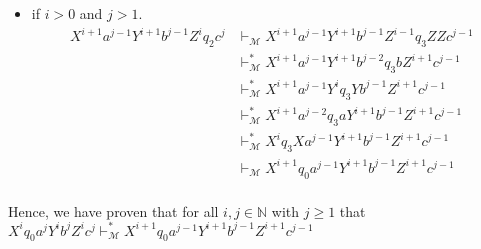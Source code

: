 \documentclass[12pt]{article}
\begin{document}
\begin{itemize}
  \item if \(i > 0\) and \(j > 1\).
  \begin{align*}
    X^{i+1}a^{j-1}Y^{i+1}b^{j-1}Z^iq_2c^j & \vdash_\mathcal{M} X^{i+1}a^{j-1}Y^{i+1}b^{j-1}Z^{i-1}q_3ZZc^{j-1} \tag*{(transition from \(q_2\) to \(q_3\))}\\
    & \vdash^{*}_\mathcal{M} X^{i+1}a^{j-1}Y^{i+1}b^{j-2}q_3bZ^{i+1}c^{j-1} \tag*{(L3 by taking x = Z)}\\
    & \vdash^{*}_\mathcal{M} X^{i+1}a^{j-1}Y^iq_3Yb^{j-1}Z^{i+1}c^{j-1} \tag*{(L3 by taking x = b)}\\
    & \vdash^{*}_\mathcal{M} X^{i+1}a^{j-2}q_3aY^{i+1}b^{j-1}Z^{i+1}c^{j-1} \tag*{(L3 by taking x = Y)}\\
    & \vdash^{*}_\mathcal{M} X^iq_3Xa^{j-1}Y^{i+1}b^{j-1}Z^{i+1}c^{j-1} \tag*{(L3 by taking x = a)}\\
    & \vdash_\mathcal{M} X^{i+1}q_0a^{j-1}Y^{i+1}b^{j-1}Z^{i+1}c^{j-1} \tag*{(transition from \(q_3\) to \(q_0\))}\\
  \end{align*}
  \end{itemize}
Hence, we have proven that for all \(i, j \in \mathbb{N}\) with \(j \geq 1\) that \(X^iq_0a^jY^ib^jZ^ic^j \vdash^{*}_\mathcal{M} X^{i+1}q_0a^{j-1}Y^{i+1}b^{j-1}Z^{i+1}c^{j-1}\)
\end{document}
